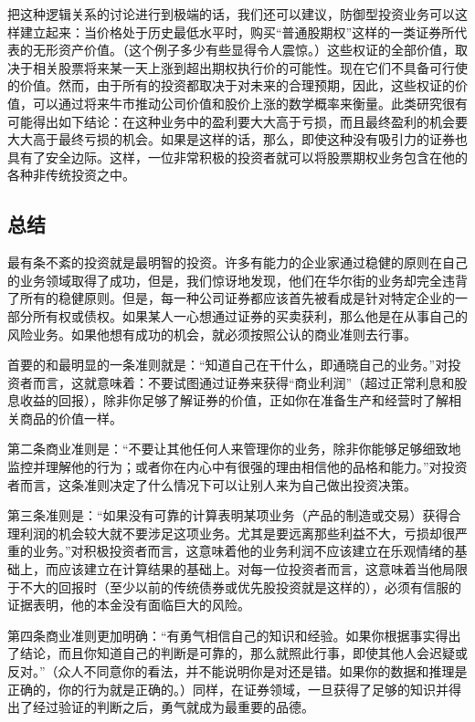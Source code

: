 \documentclass[12pt,oneside]{book}
\begin{document}
把这种逻辑关系的讨论进行到极端的话，我们还可以建议，防御型投资业务可以这样建立起来：当价格处于历史最低水平时，购买“普通股期权”这样的一类证券所代表的无形资产价值。（这个例子多少有些显得令人震惊。）这些权证的全部价值，取决于相关股票将来某一天上涨到超出期权执行价的可能性。现在它们不具备可行使的价值。然而，由于所有的投资都取决于对未来的合理预期，因此，这些权证的价值，可以通过将来牛市推动公司价值和股价上涨的数学概率来衡量。此类研究很有可能得出如下结论：在这种业务中的盈利要大大高于亏损，而且最终盈利的机会要大大高于最终亏损的机会。如果是这样的话，那么，即使这种没有吸引力的证券也具有了安全边际。这样，一位非常积极的投资者就可以将股票期权业务包含在他的各种非传统投资之中。

\subsection{总结}
最有条不紊的投资就是最明智的投资。许多有能力的企业家通过稳健的原则在自己的业务领域取得了成功，但是，我们惊讶地发现，他们在华尔街的业务却完全违背了所有的稳健原则。但是，每一种公司证券都应该首先被看成是针对特定企业的一部分所有权或债权。如果某人一心想通过证券的买卖获利，那么他是在从事自己的风险业务。如果他想有成功的机会，就必须按照公认的商业准则去行事。

首要的和最明显的一条准则就是：“知道自己在干什么，即通晓自己的业务。”对投资者而言，这就意味着：不要试图通过证券来获得“商业利润”（超过正常利息和股息收益的回报），除非你足够了解证券的价值，正如你在准备生产和经营时了解相关商品的价值一样。

第二条商业准则是：“不要让其他任何人来管理你的业务，除非你能够足够细致地监控并理解他的行为；或者你在内心中有很强的理由相信他的品格和能力。”对投资者而言，这条准则决定了什么情况下可以让别人来为自己做出投资决策。

第三条准则是：“如果没有可靠的计算表明某项业务（产品的制造或交易）获得合理利润的机会较大就不要涉足这项业务。尤其是要远离那些利益不大，亏损却很严重的业务。”对积极投资者而言，这意味着他的业务利润不应该建立在乐观情绪的基础上，而应该建立在计算结果的基础上。对每一位投资者而言，这意味着当他局限于不大的回报时（至少以前的传统债券或优先股投资就是这样的），必须有信服的证据表明，他的本金没有面临巨大的风险。

第四条商业准则更加明确：“有勇气相信自己的知识和经验。如果你根据事实得出了结论，而且你知道自己的判断是可靠的，那么就照此行事，即使其他人会迟疑或反对。”（众人不同意你的看法，并不能说明你是对还是错。如果你的数据和推理是正确的，你的行为就是正确的。）同样，在证券领域，一旦获得了足够的知识并得出了经过验证的判断之后，勇气就成为最重要的品德。
\end{document}
